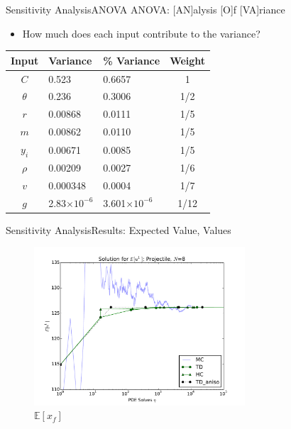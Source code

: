 \documentclass{beamer}
\newcommand{\expv}[1]{\ensuremath{\mathbb{E}[ #1]}}
\begin{document}
\begin{frame}[label=sens_res]{Sensitivity Analysis}{ANOVA}
ANOVA: [AN]alysis [O]f [VA]riance
\begin{itemize}
\item How much does each input contribute to the variance?
\end{itemize}
\begin{table}
\centering
  \begin{tabular}{c|l|l|c}
    Input & Variance & \% Variance & Weight\\ \hline
    $C$ & 0.523 & 0.6657 & 1\\
    $\theta$ & 0.236 & 0.3006 & 1/2\\
    $r$ & 0.00868 & 0.0111 & 1/5\\
    $m$ & 0.00862 & 0.0110 & 1/5\\
    $y_i$ & 0.00671 & 0.0085 & 1/5\\
    $\rho$ & 0.00209 & 0.0027 & 1/6\\
    $v$ & 0.000348 & 0.0004 & 1/7\\
    $g$ & 2.83$\times10^{-6}$ & 3.601$\times10^{-6}$ & 1/12
  \end{tabular}
\end{table}
\begin{center}\hyperlink{unc_sum}{}\end{center}
\end{frame}

\begin{frame}{Sensitivity Analysis}{Results: Expected Value, Values}
  \begin{figure}[h!]
    \centering
      \includegraphics[width=0.7\textwidth]{../graphics/projectile_solns_aniso}
      \caption{$\expv{x_f}$}
  \end{figure}
\end{frame}
\end{document}
